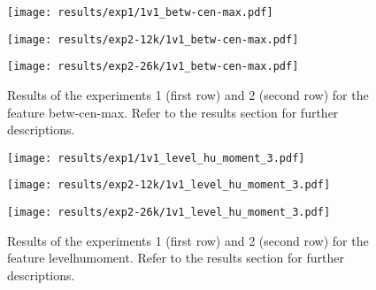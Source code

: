 \begin{figure}[h!]
	\centering
	\begin{minipage}{0.4\linewidth}
		\texttt{[image: results/exp1/1v1\_betw-cen-max.pdf]}
	\end{minipage}
	
	\begin{minipage}{0.4\linewidth}
		\texttt{[image: results/exp2-12k/1v1\_betw-cen-max.pdf]}
	\end{minipage}
	\begin{minipage}{0.4\linewidth}
		\texttt{[image: results/exp2-26k/1v1\_betw-cen-max.pdf]}
	\end{minipage}
	
	\caption[ Results: Feature betw-cen-max]{ Results of the experiments 1 (first row) and 2 (second row) for the feature betw-cen-max. Refer to the results section for further descriptions. }
	\label{fig:appendix_betw-cen-max}
\end{figure}
\newpage 


\begin{figure}[h!]
	\centering
	\begin{minipage}{0.4\linewidth}
		\texttt{[image: results/exp1/1v1\_level\_hu\_moment\_3.pdf]}
	\end{minipage}
	
	\begin{minipage}{0.4\linewidth}
		\texttt{[image: results/exp2-12k/1v1\_level\_hu\_moment\_3.pdf]}
	\end{minipage}
	\begin{minipage}{0.4\linewidth}
		\texttt{[image: results/exp2-26k/1v1\_level\_hu\_moment\_3.pdf]}
	\end{minipage}
	
	\caption[ Results: Feature level\textunderscore hu\textunderscore moment]{ Results of the experiments 1 (first row) and 2 (second row) for the feature level\textunderscore hu\textunderscore moment. Refer to the results section for further descriptions. }
	\label{fig:appendix_level_hu_moment_3}
\end{figure}


